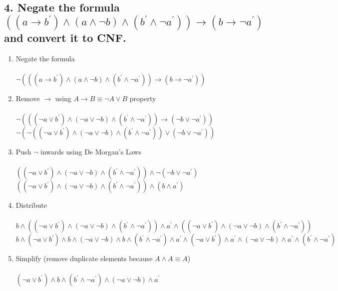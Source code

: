 \documentclass[a4paper, 14pt]{report}
\newcommand{\question}[1]{\subsection*{#1}}
\begin{document}
\question{4. Negate the formula $ ((a \rightarrow b^\prime) \wedge (a \wedge \neg b) \wedge (b^\prime \wedge \neg a^\prime)) \rightarrow (b \rightarrow \neg a^\prime) $  and convert it to CNF.} %

\begin{enumerate}

	\begin{enumerate}

		\item Negate the formula \\ \\
			$ \neg (((a \rightarrow b^\prime) \wedge (a \wedge \neg b) \wedge (b^\prime \wedge \neg a^\prime)) \rightarrow (b \rightarrow \neg a^\prime)) $
		
		\item Remove $\rightarrow$ using $A \rightarrow B \equiv \neg A \vee B$ property \\ \\
			$ \neg (((\neg a \vee b^\prime) \wedge (\neg a \vee \neg b) \wedge (b^\prime \wedge \neg a^\prime)) \rightarrow (\neg b \vee \neg a^\prime)) $ \\
			$ \neg (\neg ((\neg a \vee b^\prime) \wedge (\neg a \vee \neg b) \wedge (b^\prime \wedge \neg a^\prime)) \vee (\neg b \vee \neg a^\prime)) $ \\

		\item Push $\neg$ inwards using De Morgan's Laws \\ \\
			$ ((\neg a \vee b^\prime) \wedge (\neg a \vee \neg b) \wedge (b^\prime \wedge \neg a^\prime)) \wedge \neg (\neg b \vee \neg a^\prime) $ \\
			$ ((\neg a \vee b^\prime) \wedge (\neg a \vee \neg b) \wedge (b^\prime \wedge \neg a^\prime)) \wedge (b \wedge a^\prime) $ \\

		\item Distribute \\ \\ 
			$ b \wedge ((\neg a \vee b^\prime) \wedge (\neg a \vee \neg b) \wedge (b^\prime \wedge \neg a^\prime)) \wedge a^\prime \wedge  ((\neg a \vee b^\prime) \wedge (\neg a \vee \neg b) \wedge (b^\prime \wedge \neg a^\prime)) $ \\
			$ b \wedge (\neg a \vee b^\prime) \wedge b \wedge (\neg a \vee \neg b) \wedge b \wedge (b^\prime \wedge \neg a^\prime) \wedge a^\prime \wedge (\neg a \vee b^\prime) \wedge a^\prime \wedge (\neg a \vee \neg b) \wedge a^\prime \wedge (b^\prime \wedge \neg a^\prime) $

		\item Simplify (remove duplicate elements because $ A \wedge A \equiv A$) \\ \\ 
			$ (\neg a \vee b^\prime) \wedge b \wedge (b^\prime \wedge \neg a^\prime) \wedge (\neg a \vee \neg b) \wedge a^\prime  $ \\

	\end{enumerate}		
\end{enumerate}		
\end{document}
